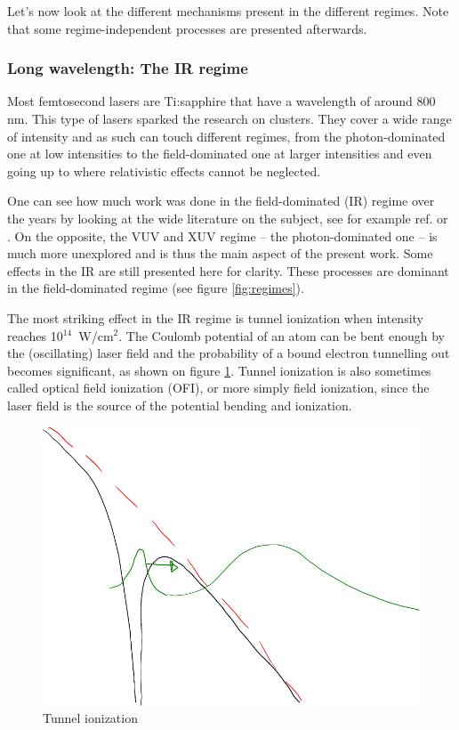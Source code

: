 Let's now look at the different mechanisms present in the different regimes.
Note that some regime-independent processes are presented afterwards.



\subsubsection{Long wavelength: The IR regime}
\label{section:intro:mechanisms:ir}
Most femtosecond lasers are Ti:sapphire that have a wavelength of around 800 nm.
This type of lasers sparked the research on clusters. They cover a wide range of
intensity and as such can touch different regimes, from the photon-dominated
one at low intensities to the field-dominated one at larger intensities and
even going up to where relativistic effects cannot be neglected.

One can see how much work was done in the field-dominated (IR) regime over the
years by looking at the wide literature on the subject, see for example ref.
\cite{Fennel2010} or \cite{Ramunno2008}. On the opposite, the VUV and XUV regime
-- the photon-dominated one -- is much more unexplored and is thus the main
aspect of the present work. Some effects in the IR are still presented here
for clarity. These processes are dominant in the field-dominated regime (see
figure \ref{fig:regimes}).


The most striking effect in the IR regime is tunnel
ionization\cite[Chapter~3]{Brabec2009} when intensity reaches 10$^{14}$~W/cm$^2$.
The Coulomb potential of an atom can be bent enough by the (oscillating) laser
field and the probability of a bound electron tunnelling out becomes significant,
as shown on figure \ref{fig:ionization:tunnel}. Tunnel ionization is also
sometimes called optical field ionization (OFI), or more simply field
ionization, since the laser field is the source of the potential bending and
ionization.

\begin{figure}
 \centering
 \includegraphics[width=0.76\columnwidth]{figures/mockups/ionization_tunnel}
 \caption{\label{fig:ionization:tunnel}Tunnel ionization
 }
\end{figure}

